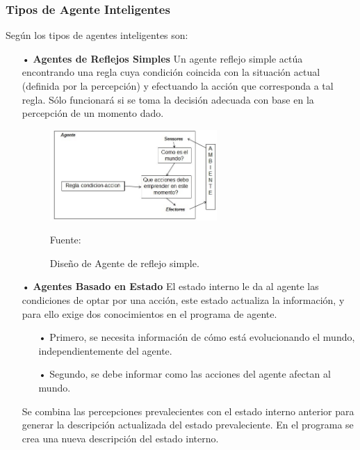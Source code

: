 \subsubsection{Tipos de Agente Inteligentes}

Según \cite{Russel} los tipos de agentes inteligentes son: 

\begin{itemize}
\item[•] {\bf Agentes de Reflejos Simples} \vskip 0.1cm
Un agente reflejo simple actúa encontrando una regla cuya condición coincida con la situación actual (definida por la percepción) y efectuando la acción que corresponda a tal regla. Sólo funcionará si se toma la decisión adecuada con base en la percepción de un momento dado.

\begin{figure}[ht]
\begin{center}
\includegraphics[width=0.6\textwidth]{Imagen3}
\end{center}
\begin{center}
\vskip -0.5cm
\caption{\small{Diseño de Agente de reflejo simple.}}
{\small{Fuente: \cite{Russel}}}
\end{center}
\end{figure}

\vskip 1cm

\item[•] {\bf Agentes Basado en Estado} \vskip 0.1cm
El estado interno le da al agente las condiciones de optar por una acción, este estado actualiza la información, y para ello exige dos conocimientos en el programa de agente.
\begin{itemize}
\item[•] Primero, se necesita información de cómo está evolucionando el mundo, independientemente del agente. \vskip 0.1cm
\item[•] Segundo, se debe informar como las acciones del agente afectan al mundo.
\end{itemize}

Se combina las percepciones prevalecientes con el estado interno anterior para generar la descripción actualizada del estado prevaleciente. En el programa se crea una nueva descripción del estado interno.


\end{itemize}

